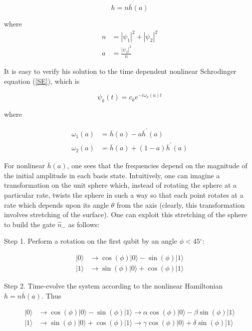 \documentclass{article}
\begin{document}
\begin{equation}
h=n\overline{h}(a)
\end{equation}

where
\begin{align}
n  &  =|\psi_{1}|^{2}+|\psi_{2}|^{2}\\
a  &  =\frac{|\psi_{2}|^{2}}{n}%
\end{align}

It is easy to verify his solution to the time dependent nonlinear Schrodinger
equation (\ref{SE}), which is%

\begin{equation}
\psi_{k}(t)=c_{k}e^{-i\omega_{k}(a)t}%
\end{equation}

where%

\begin{align}
\omega_{1}(a)  &  =\overline{h}(a)-a\overline{h}^{\prime}(a)\\
\omega_{2}(a)  &  =\overline{h}(a)+(1-a)\overline{h}^{\prime}(a)
\end{align}

For nonlinear $\overline{h}(a)$, one sees that the frequencies depend on the
magnitude of the initial amplitude in each basis state. Intuitively, one can
imagine a transformation on the unit sphere which, instead of rotating the
sphere at a particular rate, twists the sphere in such a way so that each
point rotates at a rate which depends upon its angle $\theta$ from the axis
(clearly, this transformation involves stretching of the surface). One can
exploit this stretching of the sphere to build the gate $\widehat{n}_{-}$ as follows:

Step 1. Perform a rotation on the first qubit by an angle $\phi<45{{}^{\circ}}
$:%

\begin{align}
|0\rangle &  \longrightarrow\cos(\phi)|0\rangle-\sin(\phi)|1\rangle\\
|1\rangle &  \longrightarrow\sin(\phi)|0\rangle+\cos(\phi)|1\rangle
\end{align}

Step 2. Time-evolve the system according to the nonlinear Hamiltonian
$h=n\overline{h}(a)$. Thus%

\begin{align}
|0\rangle &  \longrightarrow\cos(\phi)|0\rangle-\sin(\phi)|1\rangle
\longrightarrow\alpha\cos(\phi)|0\rangle-\beta\sin(\phi)|1\rangle\\
|1\rangle &  \longrightarrow\sin(\phi)|0\rangle+\cos(\phi)|1\rangle
\longrightarrow\gamma\cos(\phi)|0\rangle+\delta\sin(\phi)|1\rangle
\end{align}
\end{document}
